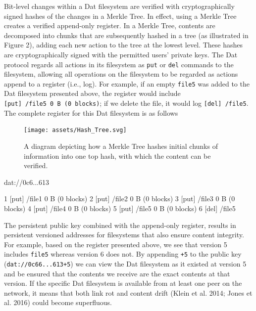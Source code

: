 \documentclass[a4paper]{article}
\newenvironment{Shaded}{\begin{snugshade}}{\end{snugshade}}
\newcommand{\ExtensionTok}[1]{#1}
\newcommand{\NormalTok}[1]{#1}
\begin{document}
Bit-level changes within a Dat filesystem are verified with
cryptographically signed hashes of the changes in a Merkle Tree. In
effect, using a Merkle Tree creates a verified append-only register. In
a Merkle Tree, contents are decomposed into chunks that are subsequently
hashed in a tree (as illustrated in Figure 2), adding each new action to
the tree at the lowest level. These hashes are cryptographically signed
with the permitted users' private keys. The Dat protocol regards all
actions in its filesystem as \texttt{put} or \texttt{del} commands to
the filesystem, allowing all operations on the filesystem to be regarded
as actions append to a register (i.e., log). For example, if an empty
\texttt{file5} was added to the Dat filesystem presented above, the
register would include \texttt{{[}put{]}\ /file5\ 0\ B\ (0\ blocks)}; if
we delete the file, it would log \texttt{{[}del{]}\ /file5}. The
complete register for this Dat filesystem is as follows

\begin{figure}

{\centering \texttt{[image: assets/Hash\_Tree.svg]} 

}

\caption{A diagram depicting how a Merkle Tree hashes initial chunks of information into one top hash, with which the content can be verified.}\label{fig:unnamed-chunk-3}
\end{figure}

\begin{Shaded}
\begin{Highlighting}[]
\ExtensionTok{dat}\NormalTok{://0c6...613}

\ExtensionTok{1}\NormalTok{ [put] /file1 0 B (0 blocks)}
\ExtensionTok{2}\NormalTok{ [put] /file2 0 B (0 blocks)}
\ExtensionTok{3}\NormalTok{ [put] /file3 0 B (0 blocks)}
\ExtensionTok{4}\NormalTok{ [put] /file4 0 B (0 blocks)}
\ExtensionTok{5}\NormalTok{ [put] /file5 0 B (0 blocks)}
\ExtensionTok{6}\NormalTok{ [del] /file5}
\end{Highlighting}
\end{Shaded}

The persistent public key combined with the append-only register,
results in persistent versioned addresses for filesystems that also
ensure content integrity. For example, based on the register presented
above, we see that version 5 includes \texttt{file5} whereas version 6
does not. By appending \texttt{+5} to the public key
(\texttt{dat://0c66...613+5}) we can view the Dat filesystem as it
existed at version 5 and be ensured that the contents we receive are the
exact contents at that version. If the specific Dat filesystem is
available from at least one peer on the network, it means that both link
rot and content drift (Klein et al. 2014; Jones et al. 2016) could
become superfluous.
\end{document}
